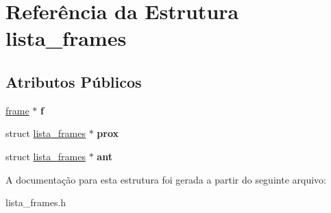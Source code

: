 \hypertarget{structlista__frames}{}\section{Referência da Estrutura lista\+\_\+frames}
\label{structlista__frames}
\subsection*{Atributos Públicos}
\begin{DoxyCompactItemize}
\item 
\mbox{\label{structlista__frames_ad7777179f480ab04a686cf8edf19addf}} 
\hyperlink{structframe}{frame} $\ast$ {\bfseries f}
\item 
\mbox{\label{structlista__frames_ac33c75b9e66a517b493e6d35a3c1efb3}} 
struct \hyperlink{structlista__frames}{lista\+\_\+frames} $\ast$ {\bfseries prox}
\item 
\mbox{\label{structlista__frames_a624232f63eb62fe5a297439a4668032c}} 
struct \hyperlink{structlista__frames}{lista\+\_\+frames} $\ast$ {\bfseries ant}
\end{DoxyCompactItemize}


A documentação para esta estrutura foi gerada a partir do seguinte arquivo\+:\begin{DoxyCompactItemize}
\item 
lista\+\_\+frames.\+h\end{DoxyCompactItemize}
